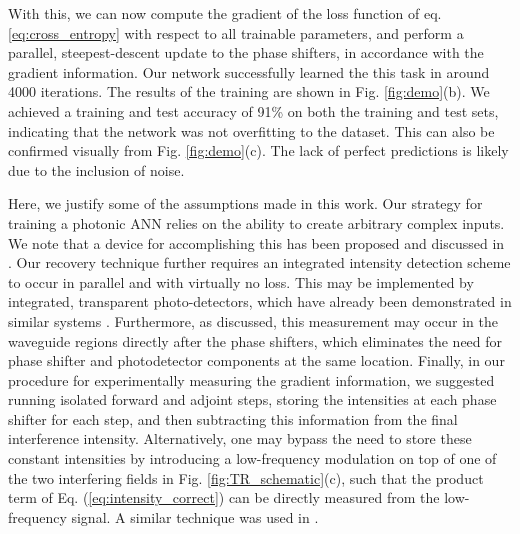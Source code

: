 With this, we can now compute the gradient of the loss function of eq. \ref{eq:cross_entropy} with respect to all trainable parameters, and perform a parallel, steepest-descent update to the phase shifters, in accordance with the gradient information. Our network successfully learned the this task in around 4000 iterations. The results of the training are shown in Fig. \ref{fig:demo}(b). We achieved a training and test accuracy of 91\% on both the training and test sets, indicating that the network was not overfitting to the dataset.  This can also be confirmed visually from Fig. \ref{fig:demo}(c).  The lack of perfect predictions is likely due to the inclusion of noise.



 
Here, we justify some of the assumptions made in this work.  Our strategy for training a photonic ANN relies on the ability to create arbitrary complex inputs.  We note that a device for accomplishing this has been proposed and discussed in \cite{Miller2017}.  Our recovery technique further requires an integrated intensity detection scheme to occur in parallel and with virtually no loss.  This may be implemented by integrated, transparent photo-detectors, which have already been demonstrated in similar systems \cite{Annoni2017}.  Furthermore, as discussed, this measurement may occur in the waveguide regions directly after the phase shifters, which eliminates the need for phase shifter and photodetector components at the same location.  Finally, in our procedure for experimentally measuring the gradient information, we suggested running isolated forward and adjoint steps, storing the intensities at each phase shifter for each step, and then subtracting this information from the final interference intensity. Alternatively, one may bypass the need to store these constant intensities by introducing a low-frequency modulation on top of one of the two interfering fields in Fig. \ref{fig:TR_schematic}(c), such that the product term of Eq. (\ref{eq:intensity_correct}) can be directly measured from the low-frequency signal.  A similar technique was used in \cite{Annoni2017}.

